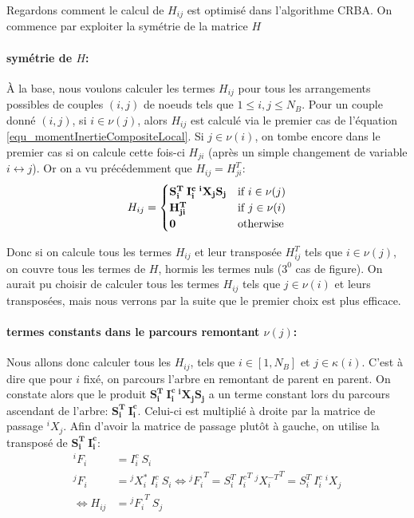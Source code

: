 \documentclass{report}
\begin{document}
Regardons comment le calcul de $H_{ij}$ est optimisé dans l'algorithme CRBA. On commence par exploiter la symétrie de la matrice $H$

\paragraph{symétrie de $H$:}
À la base, nous voulons calculer les termes $H_{ij}$ pour tous les arrangements possibles de couples $(i,j)$ de noeuds tels que $1 \leqslant i,j \leqslant N_B$. Pour un couple donné $(i,j)$, si $i \in \nu(j)$, alors $H_{ij}$ est calculé via le premier cas de l'équation \eqref{equ_momentInertieCompositeLocal}. Si $j \in \nu(i)$, on tombe encore dans le premier cas si on calcule cette fois-ci $H_{ji}$ (après un simple changement de variable $i \leftrightarrow j$). Or on a vu précédemment que $H_{ij}={H_{ji}^T}$:
\begin{equation}
H_{ij} = 
\begin{cases}
\mathbf{{S_i^T} \: {I_i^c} \: {^iX_j} S_j} & \textnormal{if } i \in \nu(j) \\
\mathbf{H_{ji}^T} & \textnormal{if } j \in \nu(i) \\
\mathbf{0} & \textnormal{otherwise}
\end{cases} \label{equ_momentInertieCompositeLocal}
\end{equation}
\begin{flushleft}
Donc si on calcule tous les termes $H_{ij}$ et leur transposée $H_{ij}^T$ tels que $i \in \nu(j)$, on couvre tous les termes de $H$, hormis les termes nuls ($3^0$ cas de figure). On aurait pu choisir de calculer tous les termes $H_{ij}$ tels que $j \in \nu(i)$ et leurs transposées, mais nous verrons par la suite que le premier choix est plus efficace.
\end{flushleft}

\paragraph{termes constants dans le parcours remontant $\nu(j)$:}
Nous allons donc calculer tous les $H_{ij}$, tels que $i \in [1,N_B]$ et $j \in \kappa(i)$. C'est à dire que pour $i$ fixé, on parcours l'arbre en remontant de parent en parent. On constate alors que le produit $\mathbf{{S_i^T} \: {I_i^c} \: {^iX_j} S_j}$ a un terme constant lors du parcours ascendant de l'arbre: $\mathbf{{S_i^T} \: {I_i^c}}$. Celui-ci est multiplié à droite par la matrice de passage $^iX_j$. Afin d'avoir la matrice de passage plutôt à gauche, on utilise la transposé de $\mathbf{{S_i^T} \: {I_i^c}}$:
\begin{align}
{^iF_i} &= {I_i^c} \: S_i \\
{^jF_i} &= {^jX_i^*} \: {I_i^c} \: S_i \iff {^jF_i}^T = {S_i^T} \: {I_i^c}^T \: {^jX_i^{-T}}^T = {S_i^T} \: {I_i^c} \: {^iX_j} \\
\iff H_{ij} &= {^jF_i}^T \: S_j
\end{align}
\end{document}
